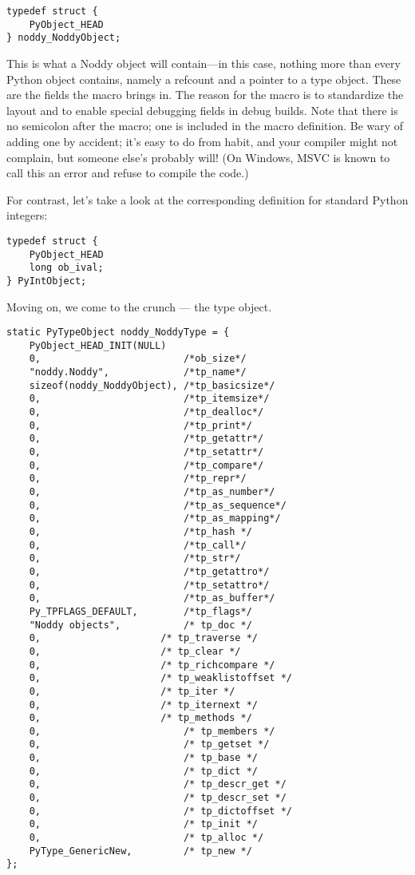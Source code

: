 \begin{verbatim}
typedef struct {
    PyObject_HEAD
} noddy_NoddyObject;
\end{verbatim}

This is what a Noddy object will contain---in this case, nothing more
than every Python object contains, namely a refcount and a pointer to a type
object.  These are the fields the  macro brings
in.  The reason for the macro is to standardize the layout and to
enable special debugging fields in debug builds.  Note that there is
no semicolon after the  macro; one is included in
the macro definition.  Be wary of adding one by accident; it's easy to
do from habit, and your compiler might not complain, but someone
else's probably will!  (On Windows, MSVC is known to call this an
error and refuse to compile the code.)

For contrast, let's take a look at the corresponding definition for
standard Python integers:

\begin{verbatim}
typedef struct {
    PyObject_HEAD
    long ob_ival;
} PyIntObject;
\end{verbatim}

Moving on, we come to the crunch --- the type object.

\begin{verbatim}
static PyTypeObject noddy_NoddyType = {
    PyObject_HEAD_INIT(NULL)
    0,                         /*ob_size*/
    "noddy.Noddy",             /*tp_name*/
    sizeof(noddy_NoddyObject), /*tp_basicsize*/
    0,                         /*tp_itemsize*/
    0,                         /*tp_dealloc*/
    0,                         /*tp_print*/
    0,                         /*tp_getattr*/
    0,                         /*tp_setattr*/
    0,                         /*tp_compare*/
    0,                         /*tp_repr*/
    0,                         /*tp_as_number*/
    0,                         /*tp_as_sequence*/
    0,                         /*tp_as_mapping*/
    0,                         /*tp_hash */
    0,                         /*tp_call*/
    0,                         /*tp_str*/
    0,                         /*tp_getattro*/
    0,                         /*tp_setattro*/
    0,                         /*tp_as_buffer*/
    Py_TPFLAGS_DEFAULT,        /*tp_flags*/
    "Noddy objects",           /* tp_doc */
    0,		               /* tp_traverse */
    0,		               /* tp_clear */
    0,		               /* tp_richcompare */
    0,		               /* tp_weaklistoffset */
    0,		               /* tp_iter */
    0,		               /* tp_iternext */
    0,		               /* tp_methods */
    0,                         /* tp_members */
    0,                         /* tp_getset */
    0,                         /* tp_base */
    0,                         /* tp_dict */
    0,                         /* tp_descr_get */
    0,                         /* tp_descr_set */
    0,                         /* tp_dictoffset */
    0,                         /* tp_init */
    0,                         /* tp_alloc */
    PyType_GenericNew,         /* tp_new */
};
\end{verbatim}


